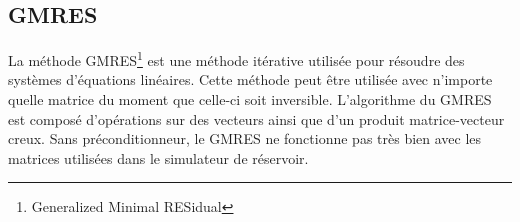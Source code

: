 \subsection{GMRES}
La méthode GMRES\footnote{Generalized Minimal RESidual} est une méthode itérative utilisée pour résoudre des systèmes d'équations linéaires.
%
Cette méthode peut être utilisée avec n'importe quelle matrice du moment que celle-ci soit inversible.
%
L'algorithme du GMRES est composé d'opérations sur des vecteurs ainsi que d'un produit matrice-vecteur creux.
%
Sans préconditionneur, le GMRES ne fonctionne pas très bien avec les matrices utilisées dans le simulateur de réservoir.
